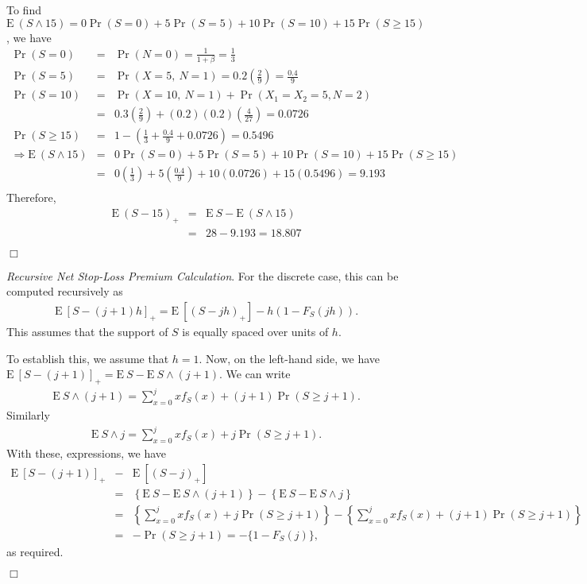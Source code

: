 \documentclass[12pt,letterpaper]{article}
\begin{document}
To find $\mathrm{E~} (S \wedge 15) = 0 \Pr (S=0) + 5 \Pr(S=5) + 10 \Pr(S=10) + 15 \Pr(S \geq 15)$, we have
\begin{eqnarray*}
\Pr(S=0) &=& \Pr(N=0) = \frac{1}{1+\beta} = \frac{1}{3} \\
\Pr(S=5) &=& \Pr(X=5, \ N=1) = 0.2 \left(\frac{2}{9} \right)= \frac{0.4}{9}\\
\Pr(S=10) &=& \Pr(X=10, \ N=1) + \Pr(X_1=X_2=5, N=2) \\
&=& 0.3 \left(\frac{2}{9} \right) + (0.2)(0.2) \left( \frac{4}{27} \right)= 0.0726 \\
\Pr(S \geq 15) &=& 1 - \left(\frac{1}{3} + \frac{0.4}{9} + 0.0726 \right) = 0.5496\\
\Rightarrow \mathrm{E~}(S \wedge 15) &=& 0 \Pr (S=0) + 5 \Pr(S=5) + 10 \Pr(S=10) + 15 \Pr(S \geq 15) \\
&=& 0 \left( \frac{1}{3} \right) + 5
\left( \frac{0.4}{9} \right) + 10 (0.0726) + 15 (0.5496) = 9.193\\
\end{eqnarray*}
Therefore,
\begin{eqnarray*}
\mathrm{E~}(S-15)_+ &=& \mathrm{E~}S - \mathrm{E~}(S \wedge 15) \\
&=& 28 - 9.193 = 18.807
\end{eqnarray*}
\begin{flushright}$\Box$\end{flushright}




\textit{Recursive Net Stop-Loss Premium Calculation}. For the discrete case, this can be computed recursively as
\begin{eqnarray*}
\mathrm{E~}\left[ S-(j+1)h \right] _{+}=\mathrm{E~}\left[ ( S-jh )_{+} \right] -h \left( 1-F_S(jh)
\right) .
\end{eqnarray*}
This assumes that the support of $S$ is equally spaced over units of $h$.

To establish this, we assume that $h=1$. Now, on the left-hand side, we have $\mathrm{E~}\left[ S-(j+1) \right] _{+}=\mathrm{E~}S - \mathrm{E~}S\wedge (j+1)$. We can write
\begin{eqnarray*}
\mathrm{E~}S\wedge (j+1) = \sum_{x=0}^{j}xf_S(x) + (j+1)\Pr(S \ge j+1).
\end{eqnarray*}
Similarly
\begin{eqnarray*}
\mathrm{E~}S\wedge j = \sum_{x=0}^{j}xf_S(x) + j\Pr(S\ge j+1).
\end{eqnarray*}
With these, expressions, we have
\begin{eqnarray*}
\mathrm{E~}\left[ S-(j+1) \right] _{+} &-& \mathrm{E~}\left[ ( S-j )_{+} \right]  \\
&=&\left\{\mathrm{E~}S - \mathrm{E~}S\wedge (j+1) \right\}
-\left\{\mathrm{E~}S - \mathrm{E~}S\wedge j \right\} \\
&=&\left\{ \sum_{x=0}^{j}xf_S(x) + j\Pr(S\ge j+1) \right\}
- \left\{ \sum_{x=0}^{j}xf_S(x) + (j+1)\Pr(S \ge j+1) \right\} \\
&=& -\Pr(S\ge j+1) = -\{1 - F_{S}(j)\},
\end{eqnarray*}
as required.
\begin{flushright}$\Box$\end{flushright}
\end{document}
